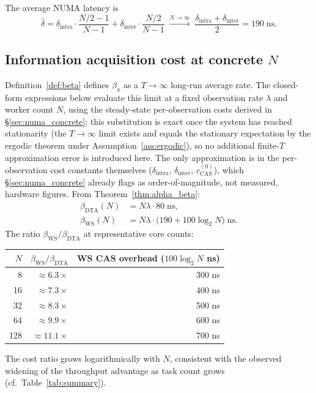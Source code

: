 \documentclass[11pt,a4paper]{article}
\begin{document}
The average NUMA latency is
\begin{equation}\label{eq:delta_bar_numa}
  \bar\delta
  = \delta_{\mathrm{intra}}\cdot\frac{N/2-1}{N-1}
  + \delta_{\mathrm{inter}}\cdot\frac{N/2}{N-1}
  \;\xrightarrow{N\to\infty}\;
  \frac{\delta_{\mathrm{intra}}+\delta_{\mathrm{inter}}}{2}
  = 190\;\mathrm{ns}.
\end{equation}

\subsection{Information acquisition cost at concrete $N$}

Definition~\ref{def:beta} defines $\beta_\pi$ as a $T \to \infty$
long-run average rate. The closed-form expressions below evaluate this
limit at a fixed observation rate $\lambda$ and worker count $N$, using
the steady-state per-observation costs derived in
\S\ref{sec:numa_concrete}; this substitution is exact once the system
has reached stationarity (the $T \to \infty$ limit exists and equals the
stationary expectation by the ergodic theorem under
Assumption~\ref{ass:ergodic}), so no additional finite-$T$ approximation
error is introduced here. The only approximation is in the per-observation
cost constants themselves ($\delta_{\mathrm{intra}}$, $\delta_{\mathrm{inter}}$,
$c_{\mathrm{CAS}}^{(0)}$), which \S\ref{sec:numa_concrete} already flags
as order-of-magnitude, not measured, hardware figures.
From Theorem~\ref{thm:alpha_beta}:
\begin{align}
  \beta_{\mathrm{DTA}}(N) &= N\lambda\cdot 80\;\mathrm{ns}, \label{eq:beta_dta_num}\\
  \beta_{\mathrm{WS}}(N)  &= N\lambda\cdot\bigl(190 + 100\log_2 N\bigr)\;\mathrm{ns}.
  \label{eq:beta_ws_num}
\end{align}
The ratio $\beta_{\mathrm{WS}}/\beta_{\mathrm{DTA}}$ at representative core counts:
\begin{center}
\begin{tabular}{rrr}
\toprule
$N$ & $\beta_{\mathrm{WS}}/\beta_{\mathrm{DTA}}$ & WS CAS overhead ($100\log_2 N$ ns)\\
\midrule
  8 & $\approx 6.3\times$ & 300 ns \\
 16 & $\approx 7.3\times$ & 400 ns \\
 32 & $\approx 8.3\times$ & 500 ns \\
 64 & $\approx 9.9\times$ & 600 ns \\
128 & $\approx 11.1\times$ & 700 ns \\
\end{tabular}
\end{center}
The cost ratio grows logarithmically with $N$, consistent with the
observed widening of the throughput advantage as task count grows
(cf.\ Table~\ref{tab:summary}).
\end{document}
